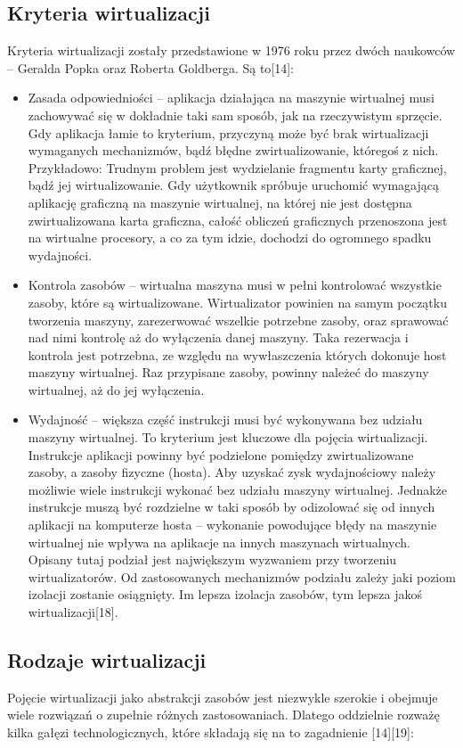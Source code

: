 \documentclass[10pt,a4paper,titlepage,twoside]{report}
\begin{document}
\subsection{Kryteria wirtualizacji}\indent \indent Kryteria wirtualizacji zostały przedstawione w 1976 roku przez dwóch naukowców – Geralda Popka oraz Roberta Goldberga. Są to[14]:
\begin{itemize}
	\item Zasada odpowiedniości – aplikacja działająca na maszynie wirtualnej musi zachowywać się w dokładnie taki sam sposób, jak na rzeczywistym sprzęcie.
Gdy aplikacja łamie to kryterium, przyczyną może być brak wirtualizacji wymaganych mechanizmów, bądź błędne zwirtualizowanie, któregoś z nich. Przykładowo: Trudnym problem jest wydzielanie fragmentu karty graficznej, bądź jej wirtualizowanie. Gdy użytkownik spróbuje uruchomić wymagającą aplikację graficzną na maszynie wirtualnej, na której nie jest dostępna zwirtualizowana karta graficzna, całość obliczeń graficznych przenoszona jest na wirtualne procesory, a co za tym idzie, dochodzi do ogromnego spadku wydajności.
	\item Kontrola zasobów – wirtualna maszyna musi w pełni kontrolować wszystkie zasoby, które są wirtualizowane. Wirtualizator powinien na samym początku tworzenia maszyny, zarezerwować wszelkie potrzebne zasoby, oraz sprawować nad nimi kontrolę aż do wyłączenia danej maszyny. Taka rezerwacja i kontrola jest potrzebna, ze względu na wywłaszczenia których dokonuje host maszyny wirtualnej. Raz przypisane zasoby, powinny należeć do maszyny wirtualnej, aż do jej wyłączenia.
	\item Wydajność – większa część instrukcji musi być wykonywana bez udziału maszyny wirtualnej.
To kryterium jest kluczowe dla pojęcia wirtualizacji. Instrukcje aplikacji powinny być podzielone pomiędzy zwirtualizowane zasoby, a zasoby fizyczne (hosta). Aby uzyskać zysk wydajnościowy należy możliwie wiele instrukcji wykonać bez udziału maszyny wirtualnej. Jednakże instrukcje muszą być rozdzielne w taki sposób by odizolować się od innych aplikacji na komputerze hosta – wykonanie powodujące błędy na maszynie wirtualnej nie wpływa na aplikacje na innych maszynach wirtualnych. Opisany tutaj podział jest największym wyzwaniem przy tworzeniu wirtualizatorów. Od zastosowanych mechanizmów podziału zależy jaki poziom izolacji zostanie osiągnięty. Im lepsza izolacja zasobów, tym lepsza jakoś wirtualizacji[18].
\end{itemize}

\subsection{Rodzaje wirtualizacji}\indent \indent Pojęcie wirtualizacji jako abstrakcji zasobów jest niezwykle szerokie i obejmuje wiele rozwiązań o zupełnie różnych zastosowaniach. Dlatego oddzielnie rozważę kilka gałęzi technologicznych, które składają się na to zagadnienie [14][19]:
\end{document}
